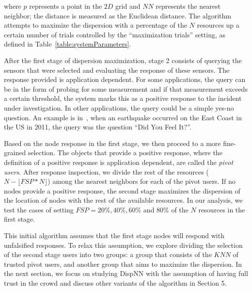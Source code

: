 \documentclass{acm_proc_article-sp}
\newcommand\floor[1]{\lfloor#1\rfloor}
\begin{document}
where $p$ represents a point in the $2D$ grid and $NN$ represents the nearest neighbor; the distance is measured as the Euclidean distance. The algorithm attempts to maximize the dispersion with a percentage of the $N$ resources up a certain number of trials controlled by the ``maximization trials'' setting, as defined in Table~\ref{table:systemParameters}. \par
After the first stage of dispersion maximization, stage 2 consists of querying the sensors that were selected and evaluating the response of these sensors. The response provided is application dependent. For some applications, the query can be in the form of probing for some measurement and if that measurement exceeds a certain threshold, the system marks this as a positive response to the incident under investigation. In other applications, the query could be a simple yes-no question. An example is in~\cite{crooks2013earthquake}, when an earthquake occurred on the East Coast in the US in 2011, the query was the question ``Did You Feel It?''.\par

 Based on the node response in the first stage, we then proceed to a more fine-grained selection. The objects that provide a positive response, where the definition of a positive response is application dependent, are called the \textit{pivot users}. After response inspection, we divide the rest of the resources ($N-\floor{FSP*N}$) among the nearest neighbors for each of the pivot users. If no nodes provide a positive response, the second stage maximizes the dispersion of the location of nodes with the rest of the available resources. In our analysis, we test the cases of setting $FSP = 20\%, 40\%, 60\%$ and $80\%$ of the $N$ resources in the first stage. \par

This initial algorithm assumes that the first stage nodes will respond with unfalsified responses. To relax this assumption, we explore dividing the selection of the second stage users into two groups: a group that consists of the $KNN$ of trusted pivot users, and another group that aims to maximize the dispersion. In the next section, we focus on studying DispNN with the assumption of having full trust in the crowd and discuss other variants of the algorithm in Section 5.\par
\end{document}
